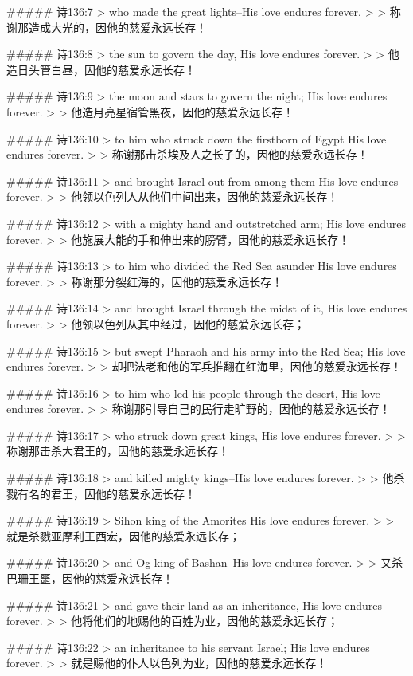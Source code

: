 ##### 诗136:7
> who made the great lights--His love endures forever.
>
> 称谢那造成大光的，因他的慈爱永远长存！


##### 诗136:8
> the sun to govern the day, His love endures forever.
>
> 他造日头管白昼，因他的慈爱永远长存！


##### 诗136:9
> the moon and stars to govern the night; His love endures forever.
>
> 他造月亮星宿管黑夜，因他的慈爱永远长存！


##### 诗136:10
> to him who struck down the firstborn of Egypt His love endures forever.
>
> 称谢那击杀埃及人之长子的，因他的慈爱永远长存！


##### 诗136:11
> and brought Israel out from among them His love endures forever.
>
> 他领以色列人从他们中间出来，因他的慈爱永远长存！


##### 诗136:12
> with a mighty hand and outstretched arm; His love endures forever.
>
> 他施展大能的手和伸出来的膀臂，因他的慈爱永远长存！


##### 诗136:13
> to him who divided the Red Sea asunder His love endures forever.
>
> 称谢那分裂红海的，因他的慈爱永远长存！


##### 诗136:14
> and brought Israel through the midst of it, His love endures forever.
>
> 他领以色列从其中经过，因他的慈爱永远长存；


##### 诗136:15
> but swept Pharaoh and his army into the Red Sea; His love endures forever.
>
> 却把法老和他的军兵推翻在红海里，因他的慈爱永远长存！


##### 诗136:16
> to him who led his people through the desert, His love endures forever.
>
> 称谢那引导自己的民行走旷野的，因他的慈爱永远长存！


##### 诗136:17
> who struck down great kings, His love endures forever.
>
> 称谢那击杀大君王的，因他的慈爱永远长存！


##### 诗136:18
> and killed mighty kings--His love endures forever.
>
> 他杀戮有名的君王，因他的慈爱永远长存！


##### 诗136:19
> Sihon king of the Amorites His love endures forever.
>
> 就是杀戮亚摩利王西宏，因他的慈爱永远长存；


##### 诗136:20
> and Og king of Bashan--His love endures forever.
>
> 又杀巴珊王噩，因他的慈爱永远长存！


##### 诗136:21
> and gave their land as an inheritance, His love endures forever.
>
> 他将他们的地赐他的百姓为业，因他的慈爱永远长存；


##### 诗136:22
> an inheritance to his servant Israel; His love endures forever.
>
> 就是赐他的仆人以色列为业，因他的慈爱永远长存！


